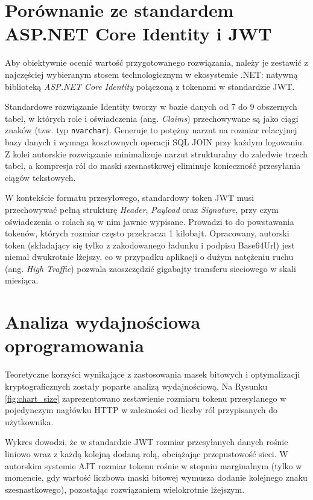 \documentclass{SGGW-thesis}
\begin{document}
\section{Porównanie ze standardem ASP.NET Core Identity i JWT}

Aby obiektywnie ocenić wartość przygotowanego rozwiązania, należy je zestawić z najczęściej wybieranym stosem technologicznym w ekosystemie .NET: natywną biblioteką \textit{ASP.NET Core Identity} połączoną z tokenami w standardzie JWT.

Standardowe rozwiązanie Identity tworzy w bazie danych od 7 do 9 obszernych tabel, w których role i oświadczenia (ang. \textit{Claims}) przechowywane są jako ciągi znaków (tzw. typ \texttt{nvarchar}). Generuje to potężny narzut na rozmiar relacyjnej bazy danych i wymaga kosztownych operacji SQL JOIN przy każdym logowaniu. 
Z kolei autorskie rozwiązanie minimalizuje narzut strukturalny do zaledwie trzech tabel, a kompresja ról do maski szesnastkowej eliminuje konieczność przesyłania ciągów tekstowych.

W kontekście formatu przesyłowego, standardowy token JWT musi przechowywać pełną strukturę \textit{Header}, \textit{Payload} oraz \textit{Signature}, przy czym oświadczenia o rolach są w nim jawnie wypisane. Prowadzi to do powstawania tokenów, których rozmiar często przekracza 1 kilobajt. Opracowany, autorski token (składający się tylko z zakodowanego ładunku i podpisu Base64Url) jest niemal dwukrotnie lżejszy, co w przypadku aplikacji o dużym natężeniu ruchu (ang. \textit{High Traffic}) pozwala zaoszczędzić gigabajty transferu sieciowego w skali miesiąca.

\section{Analiza wydajnościowa oprogramowania}

Teoretyczne korzyści wynikające z zastosowania masek bitowych i optymalizacji kryptograficznych zostały poparte analizą wydajnościową. Na Rysunku \ref{fig:chart_size} zaprezentowano zestawienie rozmiaru tokenu przesyłanego w pojedynczym nagłówku HTTP w zależności od liczby ról przypisanych do użytkownika.

Wykres dowodzi, że w standardzie JWT rozmiar przesyłanych danych rośnie liniowo wraz z każdą kolejną dodaną rolą, obciążając przepustowość sieci. W autorskim systemie AJT rozmiar tokenu rośnie w stopniu marginalnym (tylko w momencie, gdy wartość liczbowa maski bitowej wymusza dodanie kolejnego znaku szesnastkowego), pozostając rozwiązaniem wielokrotnie lżejszym.
\end{document}
